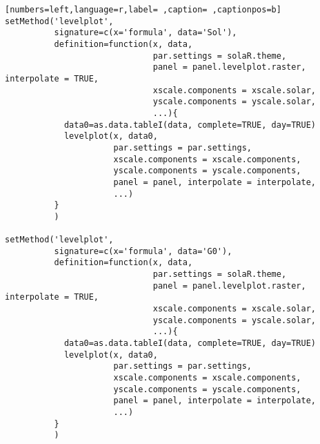 \begin{lstlisting}[numbers=left,language=r,label= ,caption= ,captionpos=b]
setMethod('levelplot',
          signature=c(x='formula', data='Sol'),
          definition=function(x, data,
                              par.settings = solaR.theme,
                              panel = panel.levelplot.raster, interpolate = TRUE,
                              xscale.components = xscale.solar,
                              yscale.components = yscale.solar,
                              ...){
            data0=as.data.tableI(data, complete=TRUE, day=TRUE)
            levelplot(x, data0,
                      par.settings = par.settings,
                      xscale.components = xscale.components,
                      yscale.components = yscale.components,
                      panel = panel, interpolate = interpolate,
                      ...)
          }
          )

setMethod('levelplot',
          signature=c(x='formula', data='G0'),
          definition=function(x, data,
                              par.settings = solaR.theme,
                              panel = panel.levelplot.raster, interpolate = TRUE,
                              xscale.components = xscale.solar,
                              yscale.components = yscale.solar,
                              ...){
            data0=as.data.tableI(data, complete=TRUE, day=TRUE)
            levelplot(x, data0, 
                      par.settings = par.settings,
                      xscale.components = xscale.components,
                      yscale.components = yscale.components,
                      panel = panel, interpolate = interpolate,
                      ...)
          }
          )
\end{lstlisting}
